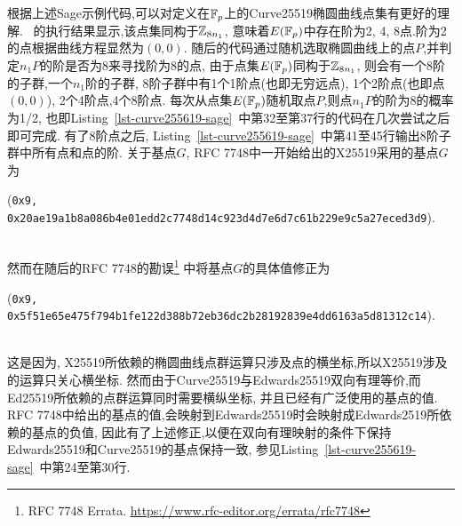 根据上述Sage示例代码,可以对定义在$\mathbb{F}_p$上的Curve25519椭圆曲线点集有更好的理解.
~的执行结果显示,该点集同构于$\mathbb{Z}_{8n_1}$,
意味着$E(\mathbb{F}_p)$中存在阶为2, 4, 8点.阶为2的点根据曲线方程显然为$(0,0)$.
随后的代码通过随机选取椭圆曲线上的点$P$,并判定$n_1P$的阶是否为8来寻找阶为8的点,
由于点集$E(\mathbb{F}_p)$同构于$\mathbb{Z}_{8n_1}$, 则会有一个8阶的子群,一个$n_1$阶的子群,
8阶子群中有1个1阶点(也即无穷远点), 1个2阶点(也即点$(0,0)$), 2个4阶点,4个8阶点.
每次从点集$E(\mathbb{F}_p)$随机取点$P$,则点$n_1P$的阶为8的概率为1/2,
也即Listing~\ref{lst-curve255619-sage}~中第32至第37行的代码在几次尝试之后即可完成.
有了8阶点之后, Listing~\ref{lst-curve255619-sage}~中第41至45行输出8阶子群中所有点和点的阶.
关于基点$G$, RFC 7748中一开始给出的X25519采用的基点$G$为\\
\centerline{(\texttt{0x9, 0x20ae19a1b8a086b4e01edd2c7748d14c923d4d7e6d7c61b229e9c5a27eced3d9}).}\\
然而在随后的RFC 7748的勘误\footnote{
RFC 7748 Errata. \url{https://www.rfc-editor.org/errata/rfc7748}}
中将基点$G$的具体值修正为\\
\centerline{(\texttt{0x9, 0x5f51e65e475f794b1fe122d388b72eb36dc2b28192839e4dd6163a5d81312c14}).}\\
这是因为, X25519所依赖的椭圆曲线点群运算只涉及点的横坐标,所以X25519涉及的运算只关心横坐标.
然而由于Curve25519与Edwards25519双向有理等价,而Ed25519所依赖的点群运算同时需要横纵坐标,
并且已经有广泛使用的基点的值.
RFC 7748中给出的基点的值,会映射到Edwards25519时会映射成Edwards2519所依赖的基点的负值,
因此有了上述修正,以便在双向有理映射的条件下保持Edwards25519和Curve25519的基点保持一致,
参见Listing~\ref{lst-curve255619-sage}~中第24至第30行.

